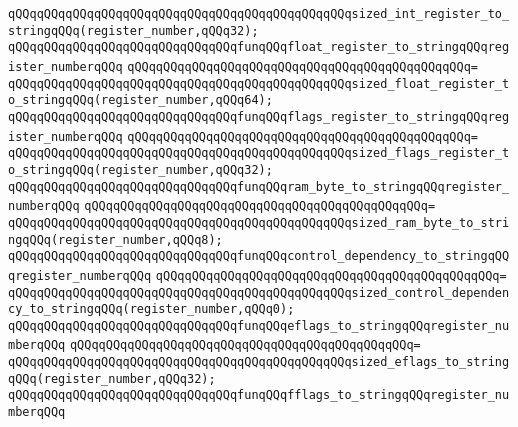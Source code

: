 \verb|qQQqqQQqqQQqqQQqqQQqqQQqqQQqqQQqqQQqqQQqqQQqqQQqsized_int_register_to_stringqQQq(register_number,qQQq32);|\newline
\newline
\verb|qQQqqQQqqQQqqQQqqQQqqQQqqQQqqQQqfunqQQqfloat_register_to_stringqQQqregister_numberqQQq|\newline
\verb|qQQqqQQqqQQqqQQqqQQqqQQqqQQqqQQqqQQqqQQqqQQqqQQq=|\newline
\verb|qQQqqQQqqQQqqQQqqQQqqQQqqQQqqQQqqQQqqQQqqQQqqQQqsized_float_register_to_stringqQQq(register_number,qQQq64);|\newline
\newline
\verb|qQQqqQQqqQQqqQQqqQQqqQQqqQQqqQQqfunqQQqflags_register_to_stringqQQqregister_numberqQQq|\newline
\verb|qQQqqQQqqQQqqQQqqQQqqQQqqQQqqQQqqQQqqQQqqQQqqQQq=|\newline
\verb|qQQqqQQqqQQqqQQqqQQqqQQqqQQqqQQqqQQqqQQqqQQqqQQqsized_flags_register_to_stringqQQq(register_number,qQQq32);|\newline
\newline
\verb|qQQqqQQqqQQqqQQqqQQqqQQqqQQqqQQqfunqQQqram_byte_to_stringqQQqregister_numberqQQq|\newline
\verb|qQQqqQQqqQQqqQQqqQQqqQQqqQQqqQQqqQQqqQQqqQQqqQQq=|\newline
\verb|qQQqqQQqqQQqqQQqqQQqqQQqqQQqqQQqqQQqqQQqqQQqqQQqsized_ram_byte_to_stringqQQq(register_number,qQQq8);|\newline
\newline
\verb|qQQqqQQqqQQqqQQqqQQqqQQqqQQqqQQqfunqQQqcontrol_dependency_to_stringqQQqregister_numberqQQq|\newline
\verb|qQQqqQQqqQQqqQQqqQQqqQQqqQQqqQQqqQQqqQQqqQQqqQQq=|\newline
\verb|qQQqqQQqqQQqqQQqqQQqqQQqqQQqqQQqqQQqqQQqqQQqqQQqsized_control_dependency_to_stringqQQq(register_number,qQQq0);|\newline
\newline
\verb|qQQqqQQqqQQqqQQqqQQqqQQqqQQqqQQqfunqQQqeflags_to_stringqQQqregister_numberqQQq|\newline
\verb|qQQqqQQqqQQqqQQqqQQqqQQqqQQqqQQqqQQqqQQqqQQqqQQq=|\newline
\verb|qQQqqQQqqQQqqQQqqQQqqQQqqQQqqQQqqQQqqQQqqQQqqQQqsized_eflags_to_stringqQQq(register_number,qQQq32);|\newline
\newline
\verb|qQQqqQQqqQQqqQQqqQQqqQQqqQQqqQQqfunqQQqfflags_to_stringqQQqregister_numberqQQq|\newline
